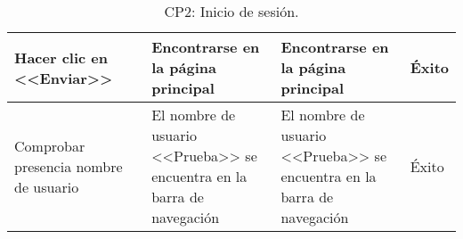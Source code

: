 \begin{center}
\begin{table}[H]
\begin{tabular}{p{}p{}p{}p{}p{}}
    Hacer clic en <<Enviar>>                             &                                                                                                         & Encontrarse en la página principal                                   & Encontrarse en la página principal                                   & Éxito                            \\ \hline
    Comprobar presencia nombre de usuario              &                                                                                                         & El nombre de usuario <<Prueba>> se encuentra en la barra de navegación & El nombre de usuario <<Prueba>> se encuentra en la barra de navegación & Éxito                           
    \end{tabular}
    \caption{CP2: Inicio de sesión.}
    \end{table}
    \end{center}
    
